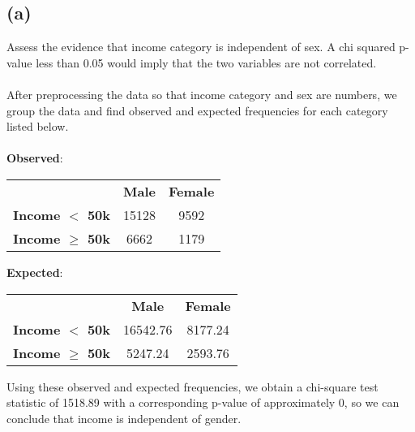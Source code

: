 \documentclass[11pt]{article}
\begin{document}
\subsection*{(a)}
Assess the evidence that income category is independent of sex. A chi squared p-value less than 0.05 would imply that the two variables are not correlated. \\ \\
After preprocessing the data so that income category and sex are numbers, we group the data and find observed and expected frequencies for each category listed below. \\ \\
\textbf{Observed}:
\begin{center}
\begin{tabular}{ c c c }
& \textbf{Male} & \textbf{Female} \\
\textbf{Income $<$ 50k} & 15128 & 9592 \\
\textbf{Income $\geq$ 50k} & 6662 & 1179
\end{tabular}
\end{center}
\textbf{Expected}:
\begin{center}
\begin{tabular}{ c c c }
& \textbf{Male} & \textbf{Female} \\
\textbf{Income $<$ 50k} & 16542.76 & 8177.24 \\
\textbf{Income $\geq$ 50k} & 5247.24 & 2593.76
\end{tabular}
\end{center}
Using these observed and expected frequencies, we obtain a chi-square test statistic of 1518.89 with a corresponding p-value of approximately 0, so we can conclude that income is independent of gender.
\end{document}
